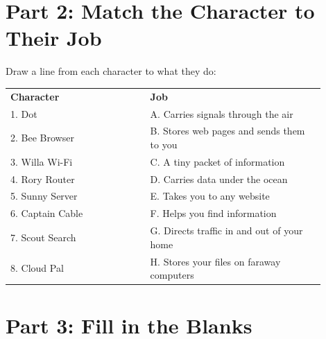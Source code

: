 \vspace{12pt}

\section*{Part 2: Match the Character to Their Job}

\begin{tcolorbox}[enhanced,colback=WarmOrange!8,colframe=WarmOrange,arc=6pt,boxrule=1pt,
  left=10pt,right=10pt,top=8pt,bottom=8pt]

Draw a line from each character to what they do:

\begin{center}
\begin{tabular}{p{0.35\linewidth}p{0.05\linewidth}p{0.5\linewidth}}
\textbf{Character} & & \textbf{Job} \\[8pt]
1. Dot & & A. Carries signals through the air \\[6pt]
2. Bee Browser & & B. Stores web pages and sends them to you \\[6pt]
3. Willa Wi-Fi & & C. A tiny packet of information \\[6pt]
4. Rory Router & & D. Carries data under the ocean \\[6pt]
5. Sunny Server & & E. Takes you to any website \\[6pt]
6. Captain Cable & & F. Helps you find information \\[6pt]
7. Scout Search & & G. Directs traffic in and out of your home \\[6pt]
8. Cloud Pal & & H. Stores your files on faraway computers \\[6pt]
\end{tabular}
\end{center}
\end{tcolorbox}

\vspace{12pt}

\section*{Part 3: Fill in the Blanks}


